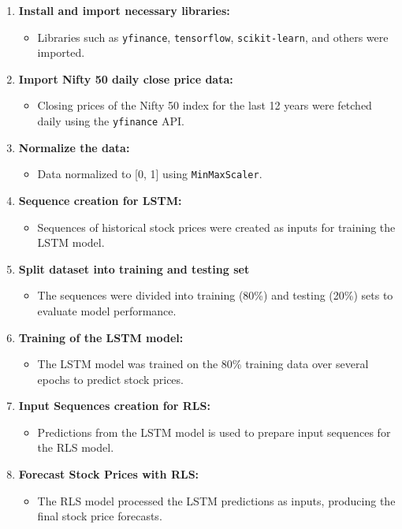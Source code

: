 \begin{enumerate}
    \item \textbf{Install and import necessary libraries:}
    \begin{itemize}
        \item Libraries such as \texttt{yfinance}, \texttt{tensorflow}, \texttt{scikit-learn}, and others were imported.
    \end{itemize}
    
    \item \textbf{Import Nifty 50 daily close price data:}
    \begin{itemize}
        \item Closing prices of the Nifty 50 index for the last 12 years were fetched daily using the \texttt{yfinance} API.
    \end{itemize}
    
    \item \textbf{Normalize the data:}
    \begin{itemize}
        \item Data normalized to [0, 1] using \texttt{MinMaxScaler}.
    \end{itemize}
    
    \item \textbf{Sequence creation for LSTM:}
    \begin{itemize}
        \item Sequences of historical stock prices were created as inputs for training the LSTM model.
    \end{itemize}
    
    \item \textbf{Split dataset into training and testing set}
    \begin{itemize}
        \item The sequences were divided into training (80\%) and testing (20\%) sets to evaluate model performance.
    \end{itemize}
    
    \item \textbf{Training of the LSTM model:}
    \begin{itemize}
        \item The LSTM model was trained on the 80\% training data over several epochs to predict stock prices.
    \end{itemize}
    
    \item \textbf{Input Sequences creation for RLS:}
    \begin{itemize}
        \item Predictions from the LSTM model is used to prepare input sequences for the RLS model.
    \end{itemize}
    
    \item \textbf{Forecast Stock Prices with RLS:}
    \begin{itemize}
        \item The RLS model processed the LSTM predictions as inputs, producing the final stock price forecasts.
    \end{itemize}
    
\end{enumerate}

